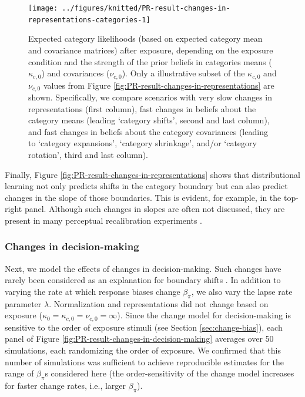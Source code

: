 \documentclass[
  11pt,
  man,floatsintext]{apa6}
\begin{document}
\begin{figure}

{\centering \texttt{[image: ../figures/knitted/PR-result-changes-in-representations-categories-1]} 

}

\caption{Expected category likelihoods (based on expected category mean and covariance matrices) after exposure, depending on the exposure condition and the strength of the prior beliefs in categories means (\(\kappa_{c,0}\)) and covariances (\(\nu_{c,0}\)). Only a illustrative subset of the \(\kappa_{c,0}\) and \(\nu_{c,0}\) values from Figure \ref{fig:PR-result-changes-in-representations} are shown. Specifically, we compare scenarios with very slow changes in representations (first column), fast changes in beliefs about the category means (leading `category shifts', second and last column), and fast changes in beliefs about the category covariances (leading to `category expansions', `category shrinkage', and/or `category rotation', third and last column).}\label{fig:PR-result-changes-in-representations-categories}
\end{figure}

Finally, Figure \ref{fig:PR-result-changes-in-representations} shows that distributional learning not only predicts shifts in the category boundary but can also predict changes in the slope of those boundaries. This is evident, for example, in the top-right panel. Although such changes in slopes are often not discussed, they are present in many perceptual recalibration experiments \autocites[e.g.,][]{drouin2016,liu-jaeger2018,liu-jaeger2019,myers-mesite2014}.

\subsubsection{Changes in decision-making}\label{changes-in-decision-making}

Next, we model the effects of changes in decision-making. Such changes have rarely been considered as an explanation for boundary shifts \autocite[but see][]{clarkedavidson2008}. In addition to varying the rate at which response biases change \(\beta_{\pi}\), we also vary the lapse rate parameter \(\lambda\). Normalization and representations did not change based on exposure (\(\kappa_0 = \kappa_{c,0} = \nu_{c,0} = \infty\)). Since the change model for decision-making is sensitive to the order of exposure stimuli (see Section \ref{sec:change-bias}), each panel of Figure \ref{fig:PR-result-changes-in-decision-making} averages over 50 simulations, each randomizing the order of exposure. We confirmed that this number of simulations was sufficient to achieve reproducible estimates for the range of \(\beta_{\pi}\)s considered here (the order-sensitivity of the change model increases for faster change rates, i.e., larger \(\beta_{\pi}\)).
\end{document}
